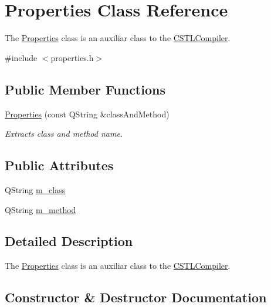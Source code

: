 \hypertarget{class_properties}{}\section{Properties Class Reference}
\label{class_properties}


The \hyperlink{class_properties}{Properties} class is an auxiliar class to the \hyperlink{class_c_s_t_l_compiler}{C\+S\+T\+L\+Compiler}.  




{\ttfamily \#include $<$properties.\+h$>$}

\subsection*{Public Member Functions}
\begin{DoxyCompactItemize}
\item 
\hyperlink{class_properties_a8ec1c6bfb9eb2da106cffba3a3d5c18e}{Properties} (const Q\+String \&class\+And\+Method)
\begin{DoxyCompactList}\small\item\em Extracts class and method name. \end{DoxyCompactList}\end{DoxyCompactItemize}
\subsection*{Public Attributes}
\begin{DoxyCompactItemize}
\item 
Q\+String \hyperlink{class_properties_a4efcf4114fb0d0163a0d6a6e894be7f3}{m\+\_\+class}
\item 
Q\+String \hyperlink{class_properties_ae5f86c3cc9714e6d6dd13c8d693d3343}{m\+\_\+method}
\end{DoxyCompactItemize}


\subsection{Detailed Description}
The \hyperlink{class_properties}{Properties} class is an auxiliar class to the \hyperlink{class_c_s_t_l_compiler}{C\+S\+T\+L\+Compiler}. 

\subsection{Constructor \& Destructor Documentation}
\mbox{\label{class_properties_a8ec1c6bfb9eb2da106cffba3a3d5c18e}} 
